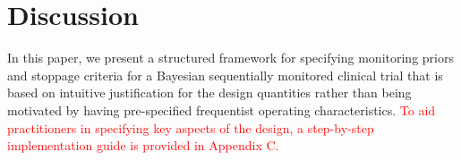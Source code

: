 \documentclass[12pt]{article}
\begin{document}
\section{Discussion}\label{sec:discussion}
In this paper, we present a structured framework for specifying monitoring priors and stoppage criteria for a Bayesian sequentially monitored clinical trial that is based on intuitive justification for the design quantities rather than being motivated by having pre-specified frequentist operating characteristics. \textcolor{red}{To aid practitioners in specifying key aspects of the design, a step-by-step implementation guide is provided in Appendix C.}
%
%
%
%
%
%
\end{document}
